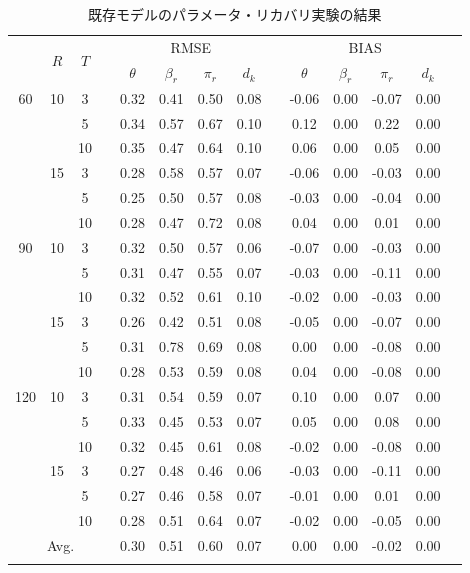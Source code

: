 \documentclass[a4paper,11pt,oneside,openany]{jsbook}
\newcommand{\bhline}[1]{\noalign{\hrule height #1}}
\begin{document}
\begin{table}[tb]
  \begin{center}
  \caption{既存モデルのパラメータ・リカバリ実験の結果}
  \setlength{\tabcolsep}{5.pt}
  \begin{tabular}{cccccccccccccc}  
  \bhline{1pt}
  \multirow{2}{*}{$J$} & \multirow{2}{*}{$R$} & \multirow{2}{*}{$T$}  && \multicolumn{4}{c}{RMSE} &&   \multicolumn{4}{c}{BIAS}  \\
  \cline{5-8}\cline{10-13}
    & & & & $\theta$ & $\beta_r$ & $\pi_{r}$ & $d_{k}$ &  & $\theta$ & $\beta_r$ & $\pi_{r}$ & $d_{k}$ \\
  \bhline{1pt}
  60  & 10 & 3  &  & 0.32 & 0.41 & 0.50 & 0.08 &  & -0.06 & 0.00 & -0.07 & 0.00 \\
    &    & 5  &  & 0.34 & 0.57 & 0.67 & 0.10 &  & 0.12  & 0.00 & 0.22  & 0.00 \\
    &    & 10 &  & 0.35 & 0.47 & 0.64 & 0.10 &  & 0.06  & 0.00 & 0.05  & 0.00 \\
  \cline{2-14}
  & 15 & 3  &  & 0.28 & 0.58 & 0.57 & 0.07 &  & -0.06 & 0.00 & -0.03 & 0.00 \\
  &    & 5  &  & 0.25 & 0.50 & 0.57 & 0.08 &  & -0.03 & 0.00 & -0.04 & 0.00 \\
  &    & 10 &  & 0.28 & 0.47 & 0.72 & 0.08 &  & 0.04  & 0.00 & 0.01  & 0.00 \\
  \hline
  90  & 10 & 3  &  & 0.32 & 0.50 & 0.57 & 0.06 &  & -0.07 & 0.00 & -0.03 & 0.00 \\
  &    & 5  &  & 0.31 & 0.47 & 0.55 & 0.07 &  & -0.03 & 0.00 & -0.11 & 0.00 \\
  &    & 10 &  & 0.32 & 0.52 & 0.61 & 0.10 &  & -0.02 & 0.00 & -0.03 & 0.00 \\
  \cline{2-14}
  & 15 & 3  &  & 0.26 & 0.42 & 0.51 & 0.08 &  & -0.05 & 0.00 & -0.07 & 0.00 \\
  &    & 5  &  & 0.31 & 0.78 & 0.69 & 0.08 &  & 0.00  & 0.00 & -0.08 & 0.00 \\
  &    & 10 &  & 0.28 & 0.53 & 0.59 & 0.08 &  & 0.04  & 0.00 & -0.08 & 0.00 \\
  \hline
  120 & 10 & 3  &  & 0.31 & 0.54 & 0.59 & 0.07 &  & 0.10  & 0.00 & 0.07  & 0.00 \\
  &    & 5  &  & 0.33 & 0.45 & 0.53 & 0.07 &  & 0.05  & 0.00 & 0.08  & 0.00 \\
  &    & 10 &  & 0.32 & 0.45 & 0.61 & 0.08 &  & -0.02 & 0.00 & -0.08 & 0.00 \\
  \cline{2-14}
  & 15 & 3  &  & 0.27 & 0.48 & 0.46 & 0.06 &  & -0.03 & 0.00 & -0.11 & 0.00 \\
  &    & 5  &  & 0.27 & 0.46 & 0.58 & 0.07 &  & -0.01 & 0.00 & 0.01  & 0.00 \\
  &    & 10 &  & 0.28 & 0.51 & 0.64 & 0.07 &  & -0.02 & 0.00 & -0.05 & 0.00\\
  \hline
  \multicolumn{4}{c}{Avg.}   &  0.30 & 0.51 & 0.60 & 0.07 &  & 0.00 & 0.00 & -0.02 & 0.00 & \\
  \bhline{1pt}
  \end{tabular}
  \label{parameters_recovery2}
  \end{center}
\end{table}
\end{document}
